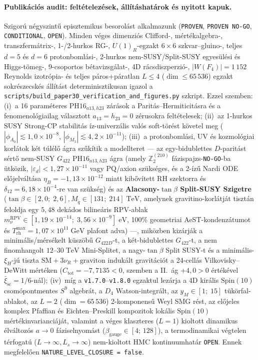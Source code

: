 \documentclass[11pt,a4paper]{article}
\begin{document}
\paragraph{Publikációs audit: feltételezések, állításhatárok és nyitott kapuk.}
Szigorú négyszintű episztemikus besorolást alkalmazunk (\texttt{PROVEN}, \texttt{PROVEN NO-GO}, \texttt{CONDITIONAL}, \texttt{OPEN}). Minden véges dimenziós Clifford-, mértékalgebra-, transzfermátrix-, 1-/2-hurkos RG-, $U(1)_R$-egzakt $6\times 6$ szkvar--gluino-, teljes $d=5$ és $d=6$ protonbomlási-, 2-hurkos nem-SUSY/Split-SUSY egyesülési és Higgs-tömeg-, 9-csoportos bétavizsgálat-, 4D rácsdiszperzió-, $|W(F_4)|=1\,152$ Reynolds izotrópia- és teljes páros+páratlan $L \le 4$ ($\dim \le 65\,536$) egzakt sokrészecskés állítást determinisztikusan igazol a \texttt{scripts/build\_paper30\_verification\_and\_figures.py} szkript. Ezzel szemben: (i)~a 16 paraméteres $\mathrm{PH16}_{a13,h23}$ zárások a Paritás--Hermiticitásra és a fenomenológiailag választott $a_{13} = h_{23} = 0$ zérusokra feltételesek; (ii)~az 1-hurkos SUSY Strong-CP stabilitás íz-univerzális valós soft-törést követel meg ($|\phi_{A_0}| \lesssim 1{,}0\times 10^{-8}$, $|\phi_{M_3}| \lesssim 4{,}2\times 10^{-11}$); (iii)~a protonbomlási, UV és kozmológiai korlátok két túlélő ágra szűkítik a modellteret --- az egy-bidublettes $D$-paritást sértő nem-SUSY $G_{422}$ $\mathrm{PH16}_{a13,h23}$ ágra (amely $\mathbb{Z}_2^{(210)}$ fázispajzs-\texttt{NO-GO}-ba ütközik, $|\varepsilon_d|<1{,}27\times 10^{-11}$ vagy PQ/axion szükséges, és a 2-ízű Nardi ODE előjelváltása $\eta_B=-1{,}13\times 10^{-12}$ miatt kibővített RH szektorra és $\delta_{12}=6{,}18\times 10^{-4}$-re van szükség) és az \textbf{Alacsony-$\tan\beta$ Split-SUSY Szigetre} ($\tan\beta\in[2{,}0;\; 2{,}6], M_{\tilde q}\in[131;\; 214]\;\mathrm{TeV}$, amelynek gravitino-korlátját tisztán feloldja egy $5{,}48$ dekádos bilineáris RPV-ablak $m_\nu^{\mathrm{RPV}}\in[1{,}19\times 10^{-14};\; 3{,}56\times 10^{-9}]\;\mathrm{eV}$, 100\% geometriai AeST-kondenzátumot és $T_{\mathrm{rh}}^{\max}=1{,}07\times 10^{11}\;\mathrm{GeV}$ plafont adva) ---, miközben kizárják a minimális/mérsékelt küszöbű $G_{422D}$-t, a két-bidublettes $G_{422}$-t, a nem finomhangolt $12\text{--}30\;\mathrm{TeV}$ Mini-Splitet, a nagy-$\tan\beta$ Split SUSY-t és a minimális-$\xi_H$-jú tiszta $\mathrm{SM}+3\nu_R+\text{graviton}$ indukált gravitációt a 24-cellás Vilkovisky--DeWitt mértéken ($C_{\mathrm{tot}}=-7{,}7135<0$, szemben a II.~ág $+4{,}0>0$ értékével $\bar\xi_{\mathrm{sc}}=1/6$-nál); (iv)~míg a \texttt{v1.7.0}--\texttt{v1.8.0} egzaktul lezárja a 4D királis $\mathrm{Spin}(10)$ csomópontmentes $S^9$ algebrát, a $D_4$ Watson-integrált, az $y_M\in[1;\; 15]$ tükörfal-ablakot, az $L=2$ ($\dim=65\,536$) 2-komponensű Weyl SMG rést, az előjeles komplex Pfaffian és Eichten--Preskill kompozitok lokális $\mathrm{Spin}(10)$ mértékinvarianciáját, valamint a véges klaszteres ($L=1$) kioltott dinamikus élváltozós $a\to 0$ fáziselnyomást ($\beta_{\mathrm{gauge}}\in[4;\,128]$), a termodinamikai végtelen térfogatú ($L\to\infty, L_s\to\infty$) nem-kioltott HMC kontinuumhatár \texttt{OPEN}. Ennek megfelelően \texttt{NATURE\_LEVEL\_CLOSURE = false}.
\end{document}
